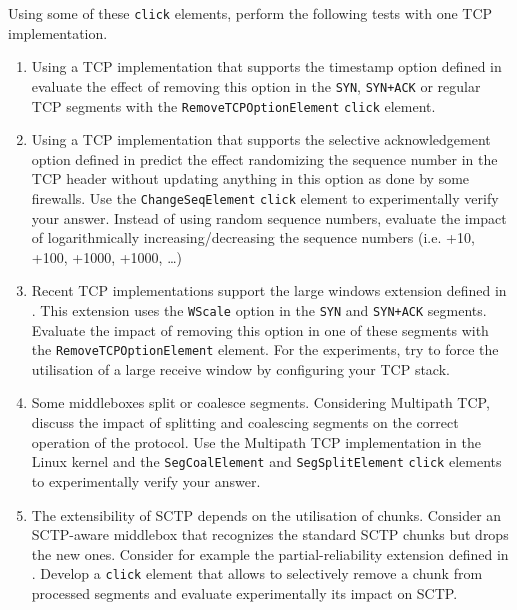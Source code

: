 Using some of these \texttt{click} elements, perform the following tests with one TCP implementation. 

\begin{enumerate}

\item Using a TCP implementation that supports the timestamp option defined in \cite{rfc1323} evaluate the effect of removing this option in the \texttt{SYN}, \texttt{SYN+ACK} or regular TCP segments with the \texttt{RemoveTCPOptionElement} \texttt{click} element.

\item Using a TCP implementation that supports the selective acknowledgement option defined in \cite{rfc2018} predict the effect randomizing the sequence number in the TCP header without updating anything in this option as done by some firewalls. Use the \texttt{ChangeSeqElement} \texttt{click} element to experimentally verify your answer. Instead of using random sequence numbers, evaluate the impact of logarithmically increasing/decreasing the sequence numbers (i.e. +10, +100, +1000, +1000, \ldots)

\item Recent TCP implementations support the large windows extension defined in \cite{rfc1323}. This extension uses the \texttt{WScale} option in the \texttt{SYN} and \texttt{SYN+ACK} segments. Evaluate the impact of removing this option in one of these segments with the \texttt{RemoveTCPOptionElement} element. For the experiments, try to force the utilisation of a large receive window by configuring your TCP stack.

\item Some middleboxes split or coalesce segments. Considering Multipath TCP, discuss the impact of splitting and coalescing segments on the correct operation of the protocol. Use the Multipath TCP implementation in the Linux kernel and the \texttt{SegCoalElement} and \texttt{SegSplitElement} \texttt{click} elements to experimentally verify your answer.



\item The extensibility of SCTP depends on the utilisation of chunks. Consider an SCTP-aware middlebox that recognizes the standard SCTP chunks but drops the new ones. Consider for example the partial-reliability extension defined in \cite{rfc3758}. Develop a \texttt{click} element that allows to selectively remove a chunk from processed segments and evaluate experimentally its impact on SCTP.

\end{enumerate}

